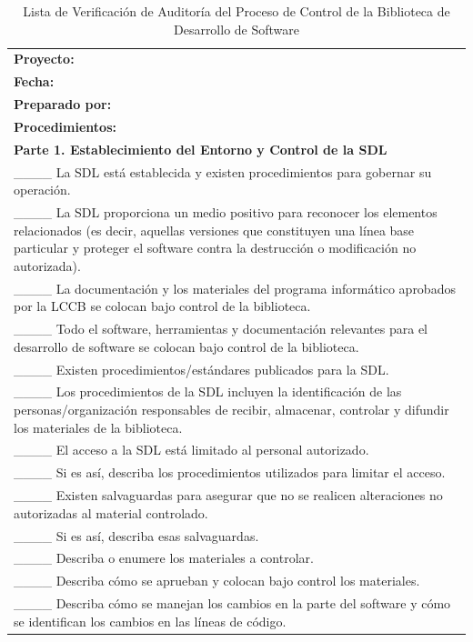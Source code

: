 \begin{table}[H]
\centering
\caption{Lista de Verificación de Auditoría del Proceso de Control de la Biblioteca de Desarrollo de Software}
\label{fig:b18}
\begin{tabular}{|p{14cm}|}
\hline
\textbf{Proyecto:} \\
\textbf{Fecha:} \\
\textbf{Preparado por:} \\
\hline
\textbf{Procedimientos:} \\
\textbf{Parte 1. Establecimiento del Entorno y Control de la SDL} \\
\_\_\_\_ La SDL está establecida y existen procedimientos para gobernar su operación. \\
\_\_\_\_ La SDL proporciona un medio positivo para reconocer los elementos relacionados (es decir, aquellas versiones que constituyen una línea base particular y proteger el software contra la destrucción o modificación no autorizada). \\
\_\_\_\_ La documentación y los materiales del programa informático aprobados por la LCCB se colocan bajo control de la biblioteca. \\
\_\_\_\_ Todo el software, herramientas y documentación relevantes para el desarrollo de software se colocan bajo control de la biblioteca. \\
\_\_\_\_ Existen procedimientos/estándares publicados para la SDL. \\
\_\_\_\_ Los procedimientos de la SDL incluyen la identificación de las personas/organización responsables de recibir, almacenar, controlar y difundir los materiales de la biblioteca. \\
\_\_\_\_ El acceso a la SDL está limitado al personal autorizado. \\
\_\_\_\_ Si es así, describa los procedimientos utilizados para limitar el acceso. \\
\_\_\_\_ Existen salvaguardas para asegurar que no se realicen alteraciones no autorizadas al material controlado. \\
\_\_\_\_ Si es así, describa esas salvaguardas. \\
\_\_\_\_ Describa o enumere los materiales a controlar. \\
\_\_\_\_ Describa cómo se aprueban y colocan bajo control los materiales. \\
\_\_\_\_ Describa cómo se manejan los cambios en la parte del software y cómo se identifican los cambios en las líneas de código. \\

\end{tabular}
\end{table}
